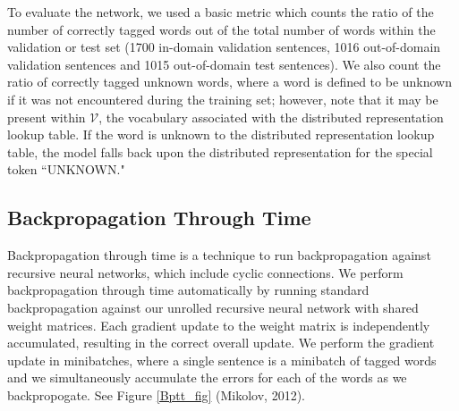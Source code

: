 \documentclass[11pt]{article}
\begin{document}
To evaluate the network, we used a basic metric which counts the ratio of the number of correctly tagged words out of the total number of words within the validation or test set (1700 in-domain validation sentences, 1016 out-of-domain validation sentences and 1015 out-of-domain test sentences). We also count the ratio of correctly tagged unknown words, where a word is defined to be unknown if it was not encountered during the training set; however, note that it may be present within $\mathcal{V}$, the vocabulary associated with the distributed representation lookup table. If the word is unknown to the distributed representation lookup table, the model falls back upon the distributed representation for the special token ``UNKNOWN."

\subsection{Backpropagation Through Time}

Backpropagation through time is a technique to run backpropagation against recursive neural networks, which include cyclic connections. We perform backpropagation through time automatically by running standard backpropagation against our unrolled recursive neural network with shared weight matrices. Each gradient update to the weight matrix is independently accumulated, resulting in the correct overall update. We perform the gradient update in minibatches, where a single sentence is a minibatch of tagged words and we simultaneously accumulate the errors for each of the words as we backpropogate. See Figure \ref{Bptt_fig} (Mikolov, 2012).
\end{document}
